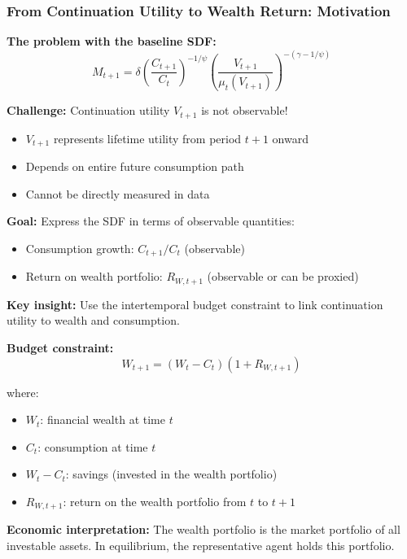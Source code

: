 \documentclass{beamer}
\begin{document}
\begin{frame}[allowframebreaks]
    \frametitle{From Continuation Utility to Wealth Return: Motivation}
    
    \textbf{The problem with the baseline SDF:}
    \begin{equation*}
        M_{t+1} = \delta \left( \frac{C_{t+1}}{C_t} \right)^{-1/\psi} \left( \frac{V_{t+1}}{\mu_t(V_{t+1})} \right)^{-(\gamma-1/\psi)}
    \end{equation*}
    
    \textbf{Challenge:} Continuation utility $V_{t+1}$ is not observable!
    \begin{itemize}
        \item $V_{t+1}$ represents lifetime utility from period $t+1$ onward
        \item Depends on entire future consumption path
        \item Cannot be directly measured in data
    \end{itemize}
    
    \textbf{Goal:} Express the SDF in terms of observable quantities:
    \begin{itemize}
        \item Consumption growth: $C_{t+1}/C_t$ (observable)
        \item Return on wealth portfolio: $R_{W,t+1}$ (observable or can be proxied)
    \end{itemize}
    
    \framebreak
    
    \textbf{Key insight:} Use the intertemporal budget constraint to link continuation utility to wealth and consumption.
    
    \textbf{Budget constraint:}
    \begin{equation*}
        W_{t+1} = (W_t - C_t)(1 + R_{W,t+1})
    \end{equation*}
    
    where:
    \begin{itemize}
        \item $W_t$: financial wealth at time $t$
        \item $C_t$: consumption at time $t$
        \item $W_t - C_t$: savings (invested in the wealth portfolio)
        \item $R_{W,t+1}$: return on the wealth portfolio from $t$ to $t+1$
    \end{itemize}
    
    \textbf{Economic interpretation:} The wealth portfolio is the market portfolio of all investable assets. In equilibrium, the representative agent holds this portfolio.
\end{frame}
\end{document}

